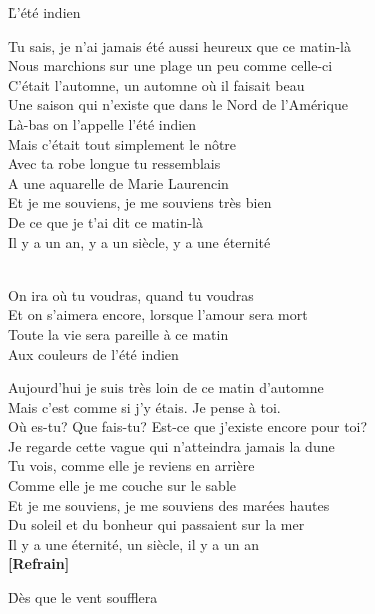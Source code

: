 \documentclass{novel}
\begin{document}
\newpage
\large

\h*{L’été indien}

Tu sais, je n'ai jamais été aussi heureux que ce matin-là \\
Nous marchions sur une plage un peu comme celle-ci \\
C'était l'automne, un automne où il faisait beau \\
Une saison qui n'existe que dans le Nord de l'Amérique \\
Là-bas on l'appelle l'été indien \\
Mais c'était tout simplement le nôtre \\
Avec ta robe longue tu ressemblais \\
A une aquarelle de Marie Laurencin \\
Et je me souviens, je me souviens très bien \\
De ce que je t'ai dit ce matin-là \\
Il y a un an, y a un siècle, y a une éternité \\

\begin{bfseries}
[Refrain:]\\
On ira où tu voudras, quand tu voudras \\
Et on s'aimera encore, lorsque l'amour sera mort \\
Toute la vie sera pareille à ce matin \\
Aux couleurs de l'été indien \\
\end{bfseries}

Aujourd'hui je suis très loin de ce matin d'automne \\
Mais c'est comme si j'y étais. Je pense à toi. \\
Où es-tu? Que fais-tu? Est-ce que j'existe encore pour toi? \\
Je regarde cette vague qui n'atteindra jamais la dune \\
Tu vois, comme elle je reviens en arrière \\
Comme elle je me couche sur le sable \\
Et je me souviens, je me souviens des marées hautes \\
Du soleil et du bonheur qui passaient sur la mer \\
Il y a une éternité, un siècle, il y a un an \\

\textbf{[Refrain]} 

\newpage
\small
\h*{Dès que le vent soufflera}
\end{document}
